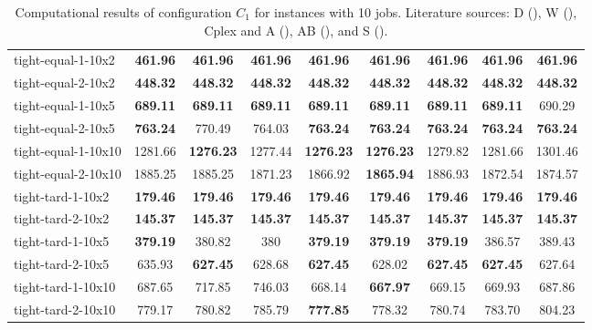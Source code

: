 \begin{table}[ht]
{\begin{tabular}{lcccccccc}
tight-equal-1-10x2 & \textbf{461.96} & \textbf{461.96} & \textbf{461.96} & \textbf{461.96} & \textbf{461.96} & \textbf{461.96} & \textbf{461.96} & \textbf{461.96} \\
tight-equal-2-10x2 & \textbf{448.32} & \textbf{448.32} & \textbf{448.32} & \textbf{448.32} & \textbf{448.32} & \textbf{448.32} & \textbf{448.32} & \textbf{448.32} \\
tight-equal-1-10x5 & \textbf{689.11} & \textbf{689.11} & \textbf{689.11} & \textbf{689.11} & \textbf{689.11} & \textbf{689.11} & \textbf{689.11} & 690.29 \\
tight-equal-2-10x5 & \textbf{763.24} & 770.49 & 764.03 & \textbf{763.24} & \textbf{763.24} & \textbf{763.24} & \textbf{763.24} & \textbf{763.24} \\
tight-equal-1-10x10 & 1281.66 & \textbf{1276.23} & 1277.44 & \textbf{1276.23} & \textbf{1276.23} & 1279.82 & 1281.66 & 1301.46 \\
tight-equal-2-10x10 & 1885.25 & 1885.25 & 1871.23 & 1866.92 & \textbf{1865.94} & 1886.93 & 1872.54 & 1874.57 \\
tight-tard-1-10x2 & \textbf{179.46} & \textbf{179.46} & \textbf{179.46} & \textbf{179.46} & \textbf{179.46} & \textbf{179.46} & \textbf{179.46} & \textbf{179.46} \\
tight-tard-2-10x2 & \textbf{145.37} & \textbf{145.37} & \textbf{145.37} & \textbf{145.37} & \textbf{145.37} & \textbf{145.37} & \textbf{145.37} & \textbf{145.37} \\
tight-tard-1-10x5 & \textbf{379.19} & 380.82 & 380 & \textbf{379.19} & \textbf{379.19} & \textbf{379.19} & 386.57 & 389.43 \\
tight-tard-2-10x5 & 635.93 & \textbf{627.45} & 628.68 & \textbf{627.45} & 628.02 & \textbf{627.45} & \textbf{627.45} & 627.64 \\
tight-tard-1-10x10 & 687.65 & 717.85 & 746.03 & 668.14 & \textbf{667.97} & 669.15 & 669.93 & 687.86 \\
tight-tard-2-10x10 & 779.17 & 780.82 & 785.79 & \textbf{777.85} & 778.32 & 780.74 & 783.70 & 804.23 \\
\hline
\end{tabular}
}
\caption{Computational results of configuration $C_1$ for instances with 10 jobs. Literature sources: D (\citet{dos2010combination}), W (\citet{wang2014variable}), Cplex and A (\citet{ahmadian2021meta}), AB (\citet{abderrazzak2022adaptive}), and S (\citet{sabri2023reinforcement}).}
\label{tab:results_10}
\end{table}
